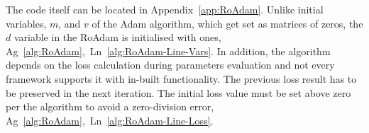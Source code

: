 
%
%
{
The code itself can be located in Appendix~\ref{app:RoAdam}.
}
{}
Unlike initial variables, $m$, and $v$ of the Adam algorithm, which get set as matrices of zeros, the $d$ variable in the RoAdam is initialised with ones, \mbox{Ag~\ref{alg:RoAdam}, Ln~\ref{alg:RoAdam-Line-Vars}}.
In addition, the algorithm depends on the loss calculation during parameters evaluation and not every framework supports it with in-built functionality.
The previous loss result has to be preserved in the next iteration.
The initial loss value must be set above zero per the algorithm to avoid a zero-division error, \mbox{Ag~\ref{alg:RoAdam}, Ln~\ref{alg:RoAdam-Line-Loss}}.
